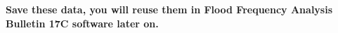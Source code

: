 \documentclass[12pt]{article}
\begin{document}
\begin{enumerate}
\textbf{Save these data, you will reuse them in Flood Frequency Analysis Bulletin 17C software later on.}

\end{enumerate}
\end{document}
